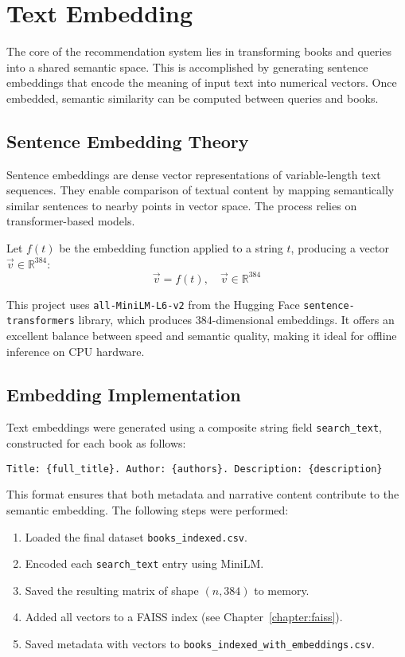 \chapter{Text Embedding}
\label{chapter:embedding}

The core of the recommendation system lies in transforming books and queries into a shared semantic space. 
This is accomplished by generating sentence embeddings that encode the meaning of input text into numerical vectors. Once embedded, semantic similarity can be computed between queries and books.

\section{Sentence Embedding Theory}
\label{sec:embedding-theory}

Sentence embeddings are dense vector representations of variable-length text sequences. 
They enable comparison of textual content by mapping semantically similar sentences to nearby points in vector space. The process relies on transformer-based models.

Let $f(t)$ be the embedding function applied to a string $t$, producing a vector $\vec{v} \in \mathbb{R}^{384}$:
\begin{equation}
\vec{v} = f(t), \quad \vec{v} \in \mathbb{R}^{384}
\end{equation}

This project uses \texttt{all-MiniLM-L6-v2} from the Hugging Face \texttt{sentence-transformers} library, which produces 384-dimensional embeddings. 
It offers an excellent balance between speed and semantic quality, making it ideal for offline inference on CPU hardware.

\section{Embedding Implementation}
\label{sec:embedding-implementation}

Text embeddings were generated using a composite string field \texttt{search\_text}, constructed for each book as follows:

\begin{verbatim}
Title: {full_title}. Author: {authors}. Description: {description}
\end{verbatim}

This format ensures that both metadata and narrative content contribute to the semantic embedding. The following steps were performed:
\begin{enumerate}
    \item Loaded the final dataset \texttt{books\_indexed.csv}.
    \item Encoded each \texttt{search\_text} entry using MiniLM.
    \item Saved the resulting matrix of shape $(n, 384)$ to memory.
    \item Added all vectors to a FAISS index (see Chapter~\ref{chapter:faiss}).
    \item Saved metadata with vectors to \texttt{books\_indexed\_with\_embeddings.csv}.
\end{enumerate}

